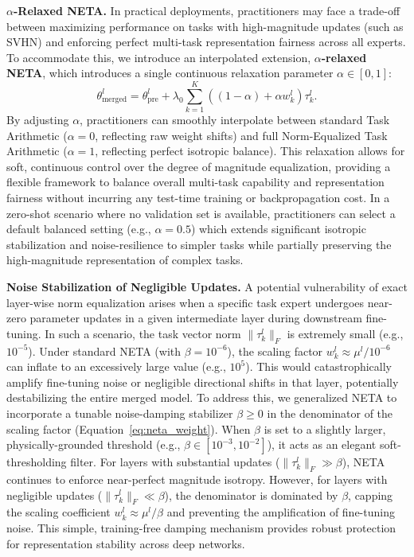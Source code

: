 \textbf{$\alpha$-Relaxed NETA.} In practical deployments, practitioners may face a trade-off between maximizing performance on tasks with high-magnitude updates (such as SVHN) and enforcing perfect multi-task representation fairness across all experts. To accommodate this, we introduce an interpolated extension, \textbf{$\alpha$-relaxed NETA}, which introduces a single continuous relaxation parameter $\alpha \in [0, 1]$:
\begin{equation}
\label{eq:alpha_relaxed}
\theta_{\text{merged}}^l = \theta_{\text{pre}}^l + \lambda_0 \sum_{k=1}^K \left( (1 - \alpha) + \alpha w_k^l \right) \tau_k^l.
\end{equation}
By adjusting $\alpha$, practitioners can smoothly interpolate between standard Task Arithmetic ($\alpha = 0$, reflecting raw weight shifts) and full Norm-Equalized Task Arithmetic ($\alpha = 1$, reflecting perfect isotropic balance). This relaxation allows for soft, continuous control over the degree of magnitude equalization, providing a flexible framework to balance overall multi-task capability and representation fairness without incurring any test-time training or backpropagation cost. In a zero-shot scenario where no validation set is available, practitioners can select a default balanced setting (e.g., $\alpha = 0.5$) which extends significant isotropic stabilization and noise-resilience to simpler tasks while partially preserving the high-magnitude representation of complex tasks.

\textbf{Noise Stabilization of Negligible Updates.}
A potential vulnerability of exact layer-wise norm equalization arises when a specific task expert undergoes near-zero parameter updates in a given intermediate layer during downstream fine-tuning. In such a scenario, the task vector norm $\|\tau_k^l\|_F$ is extremely small (e.g., $10^{-5}$). Under standard NETA (with $\beta = 10^{-6}$), the scaling factor $w_k^l \approx \mu^l / 10^{-6}$ can inflate to an excessively large value (e.g., $10^5$). This would catastrophically amplify fine-tuning noise or negligible directional shifts in that layer, potentially destabilizing the entire merged model. 
To address this, we generalized NETA to incorporate a tunable noise-damping stabilizer $\beta \ge 0$ in the denominator of the scaling factor (Equation~\ref{eq:neta_weight}). When $\beta$ is set to a slightly larger, physically-grounded threshold (e.g., $\beta \in [10^{-3}, 10^{-2}]$), it acts as an elegant soft-thresholding filter. For layers with substantial updates ($\|\tau_k^l\|_F \gg \beta$), NETA continues to enforce near-perfect magnitude isotropy. However, for layers with negligible updates ($\|\tau_k^l\|_F \ll \beta$), the denominator is dominated by $\beta$, capping the scaling coefficient $w_k^l \approx \mu^l / \beta$ and preventing the amplification of fine-tuning noise. This simple, training-free damping mechanism provides robust protection for representation stability across deep networks.

